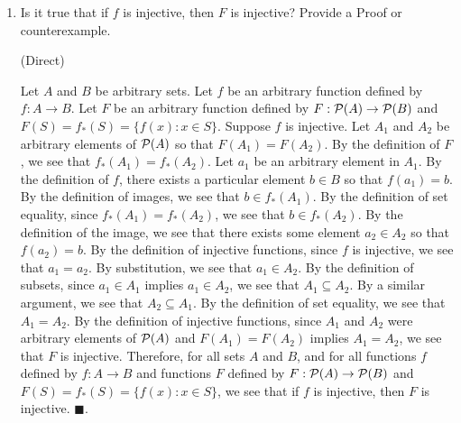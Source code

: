 \documentclass{article}
\theoremstyle{definition}
\renewcommand{\qed}{\blacksquare}
\newcommand{\powset}{{\cal P}}
\newcommand{\img}{_{*}}
\begin{document}
\begin{enumerate}
		\vspace{0.2cm}
		\item
		Is it true that if $f$ is injective, then $F$ is injective?
		Provide a Proof or counterexample.

		\vspace{0.2cm}
		 (Direct)
		\vspace{0.2cm}

		Let $A$ and $B$ be arbitrary sets.
		Let $f$ be an arbitrary function defined by $f : A \rightarrow B$.
		Let $F$ be an arbitrary function defined by $F : \powset (A) \rightarrow \powset (B)$ and $F(S) = f \img (S) = \{ f(x) : x \in S \}$.
		Suppose $f$ is injective.
		Let $A_1$ and $A_2$ be arbitrary elements of $\powset (A)$ so that $F(A_1) = F(A_2)$.
		By the definition of $F$, we see that $f \img (A_1) = f \img (A_2)$.
		Let $a_1$ be an arbitrary element in $A_1$.
		By the definition of $f$, there exists a particular element $b \in B$ so that $f(a_1) = b$.
		By the definition of images, we see that $b \in f \img (A_1)$.
		By the definition of set equality, since $f \img (A_1) = f \img (A_2)$, we see that $b \in f \img (A_2)$.
		By the definition of the image, we see that there exists some element $a_2 \in A_2$ so that $f(a_2) = b$.
		By the definition of injective functions, since $f$ is injective, we see that $a_1 = a_2$.
		By substitution, we see that $a_1 \in A_2$.
		By the definition of subsets, since $a_1 \in A_1$ implies $a_1 \in A_2$, we see that $A_1 \subseteq A_2$.
		By a similar argument, we see that $A_2 \subseteq A_1$.
		By the definition of set equality, we see that $A_1 = A_2$.
		By the definition of injective functions, since $A_1$ and $A_2$ were arbitrary elements of $\powset (A)$ and $F(A_1) = F(A_2)$ implies $A_1 = A_2$, we see that $F$ is injective.
		Therefore, for all sets $A$ and $B$, and for all functions $f$ defined by $f : A \rightarrow B$ and functions $F$ defined by $F : \powset (A) \rightarrow \powset (B)$ and $F(S) = f \img (S) = \{ f(x) : x \in S \}$, we see that if $f$ is injective, then $F$ is injective.
		$\qed$.

		\vspace{0.2cm}
	\end{enumerate}

\end{document}
